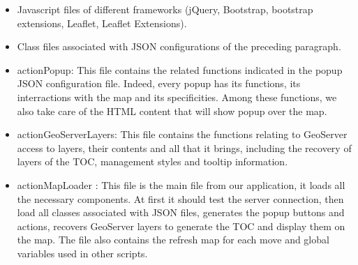 \begin {itemize}
  \item Javascript files of different frameworks (jQuery, Bootstrap, bootstrap extensions, Leaflet, Leaflet Extensions).
  \item Class files associated with JSON configurations of the preceding paragraph.
  \item actionPopup: This file contains the related functions indicated in the popup JSON configuration file. Indeed, every popup has its functions, its interractions with the map and its specificities. Among these functions, we also take care of the HTML content that will show popup over the map.
  \item actionGeoServerLayers: This file contains the functions relating to GeoServer access to layers, their contents and all that it brings, including the recovery of layers of the TOC, management styles and tooltip information.
  \item actionMapLoader : This file is the main file from our application, it loads all the necessary components. At first it should test the server connection, then load all classes associated with JSON files, generates the popup buttons and actions, recovers GeoServer layers to generate the TOC and display them on the map. The file also contains the refresh map for each move and global variables used in other scripts.
\end {itemize}








